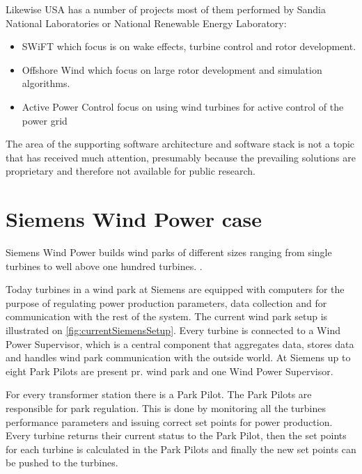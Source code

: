 Likewise USA has a number of projects most of them performed by Sandia National Laboratories or National Renewable Energy Laboratory:
\begin{itemize}
	\item SWiFT which focus is on wake effects, turbine control and rotor development.
	\item Offshore Wind which focus on large rotor development and simulation algorithms.
	\item Active Power Control focus on using wind turbines for active control of the power grid
\end{itemize}

The area of the supporting software architecture and software stack is not a topic that has received much attention, presumably because the prevailing solutions are proprietary and therefore not available for public research.


\section{Siemens Wind Power case}


\label{sec:SiemensCase}
Siemens Wind Power builds wind parks of different sizes ranging from single turbines to well above one hundred turbines. \cite{simensOffShoreProjects, simensOnShoreProjects}.

Today turbines in a wind park at Siemens are equipped with computers for the purpose of regulating power production parameters, data collection and for communication with the rest of the system. The current wind park setup is illustrated on \cref{fig:currentSiemensSetup}. Every turbine is connected to a Wind Power Supervisor, which is a central component that aggregates data, stores data and handles wind park communication with the outside world. At Siemens up to eight Park Pilots are present pr. wind park and one Wind Power Supervisor.

For every transformer station there is a Park Pilot. The Park Pilots are responsible for park regulation. This is done by monitoring all the turbines performance parameters and issuing correct set points for power production. Every turbine returns their current status to the Park Pilot, then the set points for each turbine is calculated in the Park Pilots and finally the new set points can be pushed to the turbines. 

